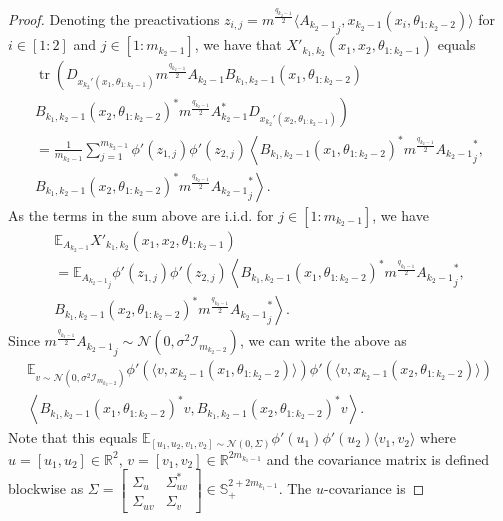 \documentclass[twoside,11pt]{article}
\newcommand{\R}{\mathbb{R}}
\newcommand{\E}{\mathbb{E}}
\newcommand{\Id}{\mathcal{I}}
\DeclareMathOperator{\tr}{tr}
\begin{document}
\begin{proof}
Denoting the preactivations $z_{i,j} = m^{\frac{q_{k_2-1}}{2}} \langle {A_{k_2-1}}_j, x_{k_2-1}(x_i, \theta_{1 : k_2-2}) \rangle$ for $i \in [1:2]$ and $j \in [1:m_{k_2-1}]$, we have that $X'_{k_1,k_2}(x_1,x_2,\theta_{1:k_2-1})$ equals
\begin{multline*}
\tr\left( D_{x_{k_2}'(x_1,\theta_{1 : k_2-1})} m^{\frac{q_{k_2-1}}{2}} A_{k_2-1} B_{k_1,k_2-1}(x_1,\theta_{1:k_2-2})
\right. \\ \left. 
B_{k_1,k_2-1}(x_2,\theta_{1:k_2-2})^* m^{\frac{q_{k_2-1}}{2}} A_{k_2-1}^* D_{x_{k_2}'(x_2,\theta_{1 : k_2-1})} \right) \\
= \frac{1}{m_{k_2-1}} \sum_{j=1}^{m_{k_2-1}} \phi'(z_{1,j}) \phi'(z_{2,j}) 
\left\langle B_{k_1,k_2-1}(x_1,\theta_{1:k_2-2})^* m^{\frac{q_{k_2-1}}{2}} {A_{k_2-1}}_j^*,
\right. \\ \left.
B_{k_1,k_2-1}(x_2,\theta_{1:k_2-2})^* m^{\frac{q_{k_2-1}}{2}} {A_{k_2-1}}_j^* \right\rangle.
\end{multline*}
As the terms in the sum above are i.i.d. for $j \in [1:m_{k_2-1}]$, we have
\begin{multline*}
\E_{A_{k_2-1}} X'_{k_1,k_2}(x_1,x_2,\theta_{1:k_2-1}) \\
= \E_{{A_{k_2-1}}_j} \phi'(z_{1,j}) \phi'(z_{2,j}) \left\langle B_{k_1,k_2-1}(x_1,\theta_{1:k_2-2})^* m^{\frac{q_{k_2-1}}{2}} {A_{k_2-1}}_j^*,
\right. \\ \left.
B_{k_1,k_2-1}(x_2,\theta_{1:k_2-2})^* m^{\frac{q_{k_2-1}}{2}} {A_{k_2-1}}_j^* \right\rangle.
\end{multline*}
Since $m^{\frac{q_{k_2-1}}{2}}{A_{k_2-1}}_j \sim \mathcal{N}( 0, \sigma^2 \Id_{m_{k_2-2}})$, we can write the above as
\begin{multline*}
\E_{v \sim \mathcal{N}( 0, \sigma^2 \Id_{m_{k_2-2}} )} \phi'( \langle v, x_{k_2-1}(x_1, \theta_{1 : k_2-2}) \rangle ) \phi'( \langle v, x_{k_2-1}(x_2, \theta_{1 : k_2-2}) \rangle ) \\
\left\langle B_{k_1,k_2-1}(x_1,\theta_{1:k_2-2})^* v,
B_{k_1,k_2-1}(x_2,\theta_{1:k_2-2})^* v \right\rangle.
\end{multline*}
Note that this equals $\E_{[u_1,u_2,v_1,v_2] \sim \mathcal{N}(0,\Sigma)} \phi'(u_1) \phi'(u_2) \langle v_1, v_2 \rangle$ where $u=[u_1,u_2]\in \R^2$, $v=[v_1,v_2] \in \R^{2m_{k_1-1}}$ and the covariance matrix is defined blockwise as $\Sigma = \left[ \begin{smallmatrix} \Sigma_u & \Sigma_{uv}^* \\ \Sigma_{uv} & \Sigma_v \end{smallmatrix} \right] \in \mathbb{S}^{2+2m_{k_1-1}}_+$. The $u$-covariance is 

\end{proof}
\end{document}
